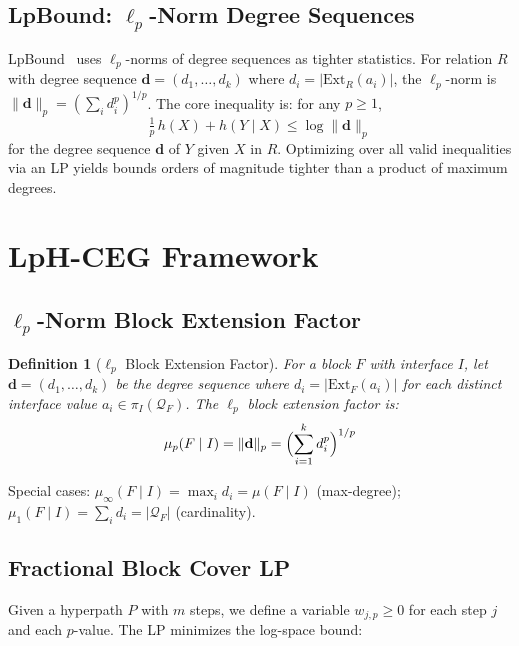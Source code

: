 \documentclass[conference]{IEEEtran}
\newcommand{\query}{\mathcal{Q}}
\newcommand{\rel}{R}
\newcommand{\block}{F}
\newcommand{\interface}{I}
\newcommand{\muFactor}[2]{\mu(#1 \mid #2)}
\newcommand{\muLp}[3]{\mu_{#1}(#2 \mid #3)}
\newcommand{\ext}[2]{\text{Ext}_{#1}(#2)}
\newcommand{\lpnorm}[2]{\|#1\|_{#2}}
\newtheorem{definition}{Definition}
\begin{document}
\subsection{LpBound: $\ell_p$-Norm Degree Sequences}

LpBound~\cite{zhang2025lpbound} uses $\ell_p$-norms of degree
sequences as tighter statistics.
For relation $\rel$ with degree sequence
$\mathbf{d} = (d_1, \ldots, d_k)$ where
$d_i = |\ext{\rel}{a_i}|$, the $\ell_p$-norm is
$\lpnorm{\mathbf{d}}{p} = (\sum_i d_i^p)^{1/p}$.
The core inequality is: for any $p \ge 1$,
\[
\tfrac{1}{p}\, h(X) + h(Y \mid X) \le \log \lpnorm{\mathbf{d}}{p}
\]
for the degree sequence $\mathbf{d}$ of $Y$ given $X$ in $\rel$.
Optimizing over all valid inequalities via an LP yields bounds
orders of magnitude tighter than a product of maximum degrees.

\section{LpH-CEG Framework}
\label{sec:framework}

\subsection{$\ell_p$-Norm Block Extension Factor}

\begin{definition}[$\ell_p$ Block Extension Factor]
\label{def:lp-mu}
For a block $\block$ with interface $\interface$, let
$\mathbf{d} = (d_1, \ldots, d_k)$ be the degree sequence where
$d_i = |\ext{\block}{a_i}|$ for each distinct interface value
$a_i \in \pi_\interface(\query_\block)$.
The $\ell_p$ block extension factor is:
\[
\muLp{p}{\block}{\interface} = \lpnorm{\mathbf{d}}{p}
= \Bigl(\sum_{i=1}^{k} d_i^p\Bigr)^{1/p}
\]
\end{definition}

\noindent Special cases:
$\muLp{\infty}{\block}{\interface} = \max_i d_i = \muFactor{\block}{\interface}$ (max-degree);
$\muLp{1}{\block}{\interface} = \sum_i d_i = |\query_\block|$ (cardinality).

\subsection{Fractional Block Cover LP}

Given a hyperpath $P$ with $m$ steps, we define a variable
$w_{j,p} \ge 0$ for each step $j$ and each $p$-value.
The LP minimizes the log-space bound:
\end{document}
